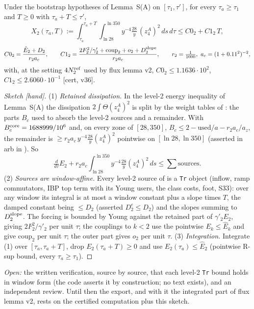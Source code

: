 \begin{lemma}[Lemma D, $k=2$]\label{D:k2}
Under the bootstrap hypotheses of Lemma~S(A) on $[\tau_1,\tau']$, for every $\tau_a\ge\tau_1$ and $T\ge0$ with $\tau_a+T\le\tau'$,
\[X_2(\tau_a,T):=\int_{\tau_a}^{\tau_a+T}\!\int_{\ln28}^{\ln350}y^{-4}\tfrac{28}{y}\,(z^A_4)^2\,ds\,d\tau\le C0_2+C1_2\,T,\]
\[C0_2=\frac{\hat E_2+D_2}{r_2a_c},\qquad C1_2=\frac{2F_2^2/\gamma'_2+\mathrm{coup}_2+o_2+D_2^{\rm slope}}{r_2a_c},\qquad r_2=\tfrac1{1000},\ a_c=(1+0.11^2)^{-2},\]
with, at the setting $4N_2^{\rm ref}$ used by flux lemma v2, $C0_2\le1.1636\cdot10^{2}$, $C1_2\le2.6060\cdot10^{-1}$ [cert, v36].
\end{lemma}
\begin{proof}[Sketch \textup{[hand]}]
(1) \emph{Retained dissipation.} In the level-2 energy inequality of Lemma~S(A) the dissipation $2\int\Theta(z^A_4)^2$ is split by the weight tables of : the parts $B_c$ used to absorb the level-2 sources and a remainder. With $B_c^{\rm core}=1688999/10^6$ and, on every zone of $[28,350]$, $B_c\le2-\mathrm{used}/a-r_2a_c/a_z$, the remainder is $\ge r_2a_c\,y^{-4}\frac{28}{y}(z^A_4)^2$ pointwise on $[\ln28,\ln350]$ (asserted in arb in ). So
\[\tfrac{d}{d\tau}E_2+r_2a_c\int_{\ln28}^{\ln350}y^{-4}\tfrac{28}{y}(z^A_4)^2\,ds\le\textstyle\sum\mathrm{sources}.\]
(2) \emph{Sources are window-affine.} Every level-2 source of  is a \texttt{Tr} object (inflow, ramp commutators, IBP top term with its Young users, the class costs, foot, S33): over any window its integral is at most a window constant plus a slope times $T$, the damped constant being $\le D_2$ (asserted $D_2^c\le D_2$) and the slopes summing to $D_2^{\rm slope}$. The forcing is bounded by Young against the retained part of $\gamma'_2E_2$, giving $2F_2^2/\gamma'_2$ per unit $\tau$; the couplings to $k<2$ use the pointwise $E_k\le\hat E_k$ and give $\mathrm{coup}_2$ per unit $\tau$; the outer part gives $o_2$ per unit $\tau$.
(3) \emph{Integration.} Integrate (1) over $[\tau_a,\tau_a+T]$, drop $E_2(\tau_a+T)\ge0$ and use $E_2(\tau_a)\le\hat E_2$ (pointwise R-sup bound, every $\tau_a\ge\tau_1$).
\end{proof}
\noindent\emph{Open:} the written verification, source by source, that each level-2 \texttt{Tr} bound holds in window form (the code asserts it by construction; no text exists), and an independent review. Until then the export, and with it the integrated part of flux lemma v2, rests on the certified computation plus this sketch.
